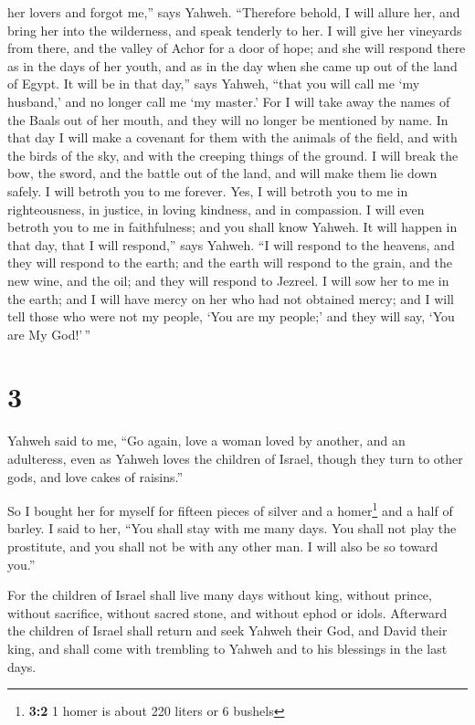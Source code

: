 her lovers and forgot me,'' says Yahweh.  ``Therefore
behold, I will allure her, and bring her into the wilderness, and speak
tenderly to her.  I will give her vineyards from there,
and the valley of Achor for a door of hope; and she will respond there
as in the days of her youth, and as in the day when she came up out of
the land of Egypt.  It will be in that day,'' says
Yahweh, ``that you will call me `my husband,' and no longer call me `my
master.'  For I will take away the names of the Baals out
of her mouth, and they will no longer be mentioned by name.
 In that day I will make a covenant for them with the
animals of the field, and with the birds of the sky, and with the
creeping things of the ground. I will break the bow, the sword, and the
battle out of the land, and will make them lie down safely.
 I will betroth you to me forever. Yes, I will betroth
you to me in righteousness, in justice, in loving kindness, and in
compassion.  I will even betroth you to me in
faithfulness; and you shall know Yahweh.  It will happen
in that day, that I will respond,'' says Yahweh. ``I will respond to the
heavens, and they will respond to the earth;  and the
earth will respond to the grain, and the new wine, and the oil; and they
will respond to Jezreel.  I will sow her to me in the
earth; and I will have mercy on her who had not obtained mercy; and I
will tell those who were not my people, `You are my people;' and they
will say, `You are My God!'\,''

\hypertarget{section-2}{%
\section{3}\label{section-2}}

 Yahweh said to me, ``Go again, love a woman loved by
another, and an adulteress, even as Yahweh loves the children of Israel,
though they turn to other gods, and love cakes of raisins.''

 So I bought her for myself for fifteen pieces of silver
and a homer\footnote{\textbf{3:2} 1 homer is about 220 liters or 6
  bushels} and a half of barley.  I said to her, ``You
shall stay with me many days. You shall not play the prostitute, and you
shall not be with any other man. I will also be so toward you.''

 For the children of Israel shall live many days without
king, without prince, without sacrifice, without sacred stone, and
without ephod or idols.  Afterward the children of Israel
shall return and seek Yahweh their God, and David their king, and shall
come with trembling to Yahweh and to his blessings in the last days.

